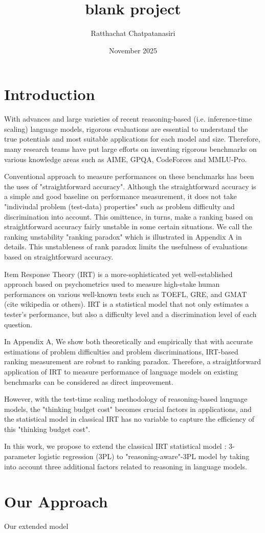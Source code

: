 \documentclass{article}
\title{blank project}
\author{Ratthachat Chatpatanasiri}
\date{November 2025}
\begin{document}
\maketitle

\section{Introduction}
With advances and large varieties of recent reasoning-based (i.e. inference-time scaling) language models, rigorous evaluations are essential to understand the true potentials and most suitable applications for each model and size. Therefore, many research teams have put large efforts on inventing rigorous benchmarks on various knowledge areas such as AIME, GPQA, CodeForces and MMLU-Pro.

Conventional approach to measure performances on these benchmarks has been the uses of "straightforward accuracy". Although the straightforward accuracy is a simple and good baseline on performance measurement, it does not take "indiviudal problem (test-data) properties" such as problem difficulty and discrimination into account. This omittence, in turns, make a ranking based on straightforward accuracy fairly unstable in some certain situations. We call the ranking unstability "ranking paradox" which is illustrated in Appendix A in details. This unstableness of rank paradox limits the usefulness of evaluations based on straightforward accuracy.

Item Response Theory (IRT) is a more-sophisticated yet well-established  approach based on psychometrics used to measure high-stake human performances on various well-known tests such as TOEFL, GRE, and GMAT (cite wikipedia or others). IRT is a statistical model that not only estimates a tester's performance, but also a difficulty level and a discrimination level of each question. 

In Appendix A, We show both theoretically and empirically  that with accurate estimations of problem difficulties and problem discriminations, IRT-based ranking measurement are robust to ranking paradox. Therefore, a straightforward application of IRT to measure performance of language models on existing benchmarks can be considered as direct improvement.

However, with the test-time scaling methodology of reasoning-based language models, the "thinking budget cost" becomes crucial factors in applications, and the statistical model in classical IRT has no variable to capture the efficiency of this "thinking budget cost".

In this work, we propose to extend the classical IRT statistical model : 3-parameter logistic regression (3PL) to "reasoning-aware"-3PL model by taking into account three additional factors related to reasoning in language models. 

\section{Our Approach}
Our extended model 
\end{document}
